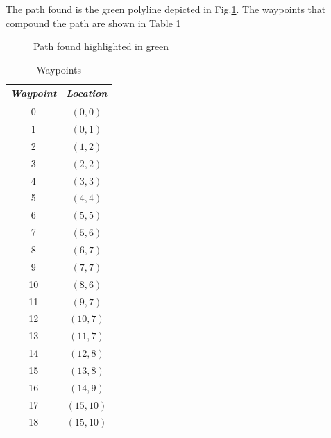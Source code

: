 \documentclass[conference]{IEEEtran}
\begin{document}
The path found is the green polyline depicted in Fig.\ref{fig:path}. The waypoints
that compound the path are shown in Table \ref{tab:waypoint}

\begin{figure}[h]
	\centering
	\caption{Path found highlighted in green}
	\label{fig:path}
\end{figure} 

\begin{table}[h]
\centering
\caption{Waypoints}
\begin{tabular}{|c|c|}
\hline 
\textit{ \textbf{Waypoint}} & \textit{ \textbf{Location}} \\
\hline 
0 & $(0, 0)$ \\
1 & $(0, 1)$ \\
2 & $(1, 2)$ \\ 
3 & $(2, 2)$ \\ 
4 & $(3, 3)$ \\ 
5 & $(4, 4)$ \\ 
6 & $(5, 5)$ \\ 
7 & $(5, 6)$ \\
8 & $(6, 7)$ \\ 
9 & $(7, 7)$ \\ 
10 & $(8, 6)$ \\ 
11 & $(9, 7)$ \\ 
12 & $(10, 7)$ \\
13 & $(11, 7)$ \\
14 & $(12, 8)$ \\
15 & $(13, 8)$ \\
16 & $(14, 9)$ \\
17 & $(15, 10)$ \\
18 & $(15, 10)$ \\ 
\hline
\end{tabular}
\label{tab:waypoint}
\end{table} 
\end{document}
